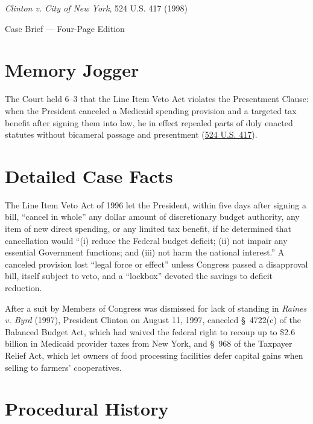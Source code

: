 \documentclass[12pt]{article}
\begin{document}
\begin{center}
{\LARGE \textit{Clinton v. City of New York}, 524 U.S. 417 (1998)\par}
\vspace{0.8em}
{\large Case Brief --- Four-Page Edition\par}
\end{center}
\vspace{1em}

\section{Memory Jogger}

The Court held 6--3 that the Line Item Veto Act violates the Presentment Clause: when the President canceled a Medicaid spending provision and a targeted tax benefit after signing them into law, he in effect repealed parts of duly enacted statutes without bicameral passage and presentment (\href{https://supreme.justia.com/cases/federal/us/524/417/}{524 U.S. 417}).

\section{Detailed Case Facts}

The Line Item Veto Act of 1996 let the President, within five days after signing a bill, ``cancel in whole'' any dollar amount of discretionary budget authority, any item of new direct spending, or any limited tax benefit, if he determined that cancellation would ``(i) reduce the Federal budget deficit; (ii) not impair any essential Government functions; and (iii) not harm the national interest.'' A canceled provision lost ``legal force or effect'' unless Congress passed a disapproval bill, itself subject to veto, and a ``lockbox'' devoted the savings to deficit reduction.

After a suit by Members of Congress was dismissed for lack of standing in \textit{Raines v. Byrd} (1997), President Clinton on August 11, 1997, canceled \S~4722(c) of the Balanced Budget Act, which had waived the federal right to recoup up to \$2.6 billion in Medicaid provider taxes from New York, and \S~968 of the Taxpayer Relief Act, which let owners of food processing facilities defer capital gains when selling to farmers' cooperatives.

\section{Procedural History}
\end{document}
